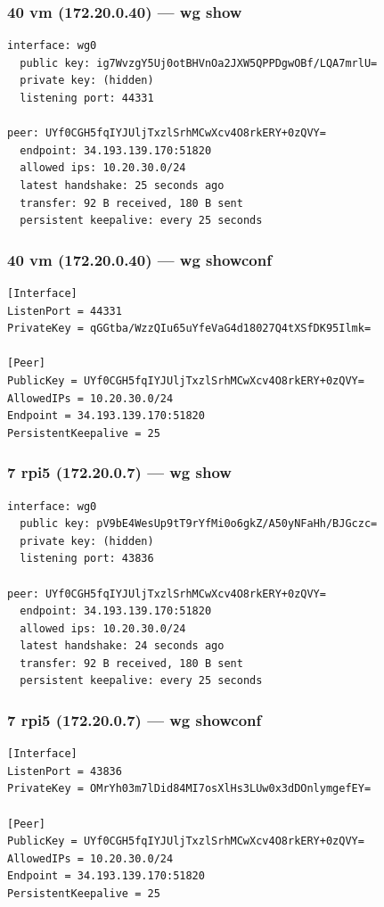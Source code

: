 \documentclass[11pt,a4paper]{article}
\begin{document}
\subsubsection*{40 vm (172.20.0.40) — wg show}
\begin{lstlisting}
interface: wg0
  public key: ig7WvzgY5Uj0otBHVnOa2JXW5QPPDgwOBf/LQA7mrlU=
  private key: (hidden)
  listening port: 44331

peer: UYf0CGH5fqIYJUljTxzlSrhMCwXcv4O8rkERY+0zQVY=
  endpoint: 34.193.139.170:51820
  allowed ips: 10.20.30.0/24
  latest handshake: 25 seconds ago
  transfer: 92 B received, 180 B sent
  persistent keepalive: every 25 seconds

\end{lstlisting}

\subsubsection*{40 vm (172.20.0.40) — wg showconf}
\begin{lstlisting}
[Interface]
ListenPort = 44331
PrivateKey = qGGtba/WzzQIu65uYfeVaG4d18027Q4tXSfDK95Ilmk=

[Peer]
PublicKey = UYf0CGH5fqIYJUljTxzlSrhMCwXcv4O8rkERY+0zQVY=
AllowedIPs = 10.20.30.0/24
Endpoint = 34.193.139.170:51820
PersistentKeepalive = 25

\end{lstlisting}

\subsubsection*{7 rpi5 (172.20.0.7) — wg show}
\begin{lstlisting}
interface: wg0
  public key: pV9bE4WesUp9tT9rYfMi0o6gkZ/A50yNFaHh/BJGczc=
  private key: (hidden)
  listening port: 43836

peer: UYf0CGH5fqIYJUljTxzlSrhMCwXcv4O8rkERY+0zQVY=
  endpoint: 34.193.139.170:51820
  allowed ips: 10.20.30.0/24
  latest handshake: 24 seconds ago
  transfer: 92 B received, 180 B sent
  persistent keepalive: every 25 seconds

\end{lstlisting}

\subsubsection*{7 rpi5 (172.20.0.7) — wg showconf}
\begin{lstlisting}
[Interface]
ListenPort = 43836
PrivateKey = OMrYh03m7lDid84MI7osXlHs3LUw0x3dDOnlymgefEY=

[Peer]
PublicKey = UYf0CGH5fqIYJUljTxzlSrhMCwXcv4O8rkERY+0zQVY=
AllowedIPs = 10.20.30.0/24
Endpoint = 34.193.139.170:51820
PersistentKeepalive = 25

\end{lstlisting}
\end{document}
